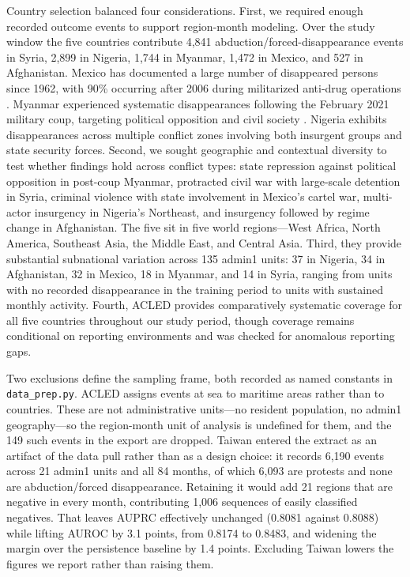 \documentclass[pdflatex,sn-mathphys-num]{sn-jnl}%
\theoremstyle{thmstyleone}%
\theoremstyle{thmstyletwo}%
\theoremstyle{thmstylethree}%
\begin{document}
Country selection balanced four considerations. First, we required enough recorded outcome events to support region-month modeling. Over the study window the five countries contribute 4,841 abduction/forced-disappearance events in Syria, 2,899 in Nigeria, 1,744 in Myanmar, 1,472 in Mexico, and 527 in Afghanistan. Mexico has documented a large number of disappeared persons since 1962, with 90\% occurring after 2006 during militarized anti-drug operations \cite{umnmexico2024}. Myanmar experienced systematic disappearances following the February 2021 military coup, targeting political opposition and civil society \cite{hrwmyanmar2021}. Nigeria exhibits disappearances across multiple conflict zones involving both insurgent groups and state security forces. Second, we sought geographic and contextual diversity to test whether findings hold across conflict types: state repression against political opposition in post-coup Myanmar, protracted civil war with large-scale detention in Syria, criminal violence with state involvement in Mexico's cartel war, multi-actor insurgency in Nigeria's Northeast, and insurgency followed by regime change in Afghanistan. The five sit in five world regions---West Africa, North America, Southeast Asia, the Middle East, and Central Asia. Third, they provide substantial subnational variation across 135 admin1 units: 37 in Nigeria, 34 in Afghanistan, 32 in Mexico, 18 in Myanmar, and 14 in Syria, ranging from units with no recorded disappearance in the training period to units with sustained monthly activity. Fourth, ACLED provides comparatively systematic coverage for all five countries throughout our study period, though coverage remains conditional on reporting environments and was checked for anomalous reporting gaps.

Two exclusions define the sampling frame, both recorded as named constants in \texttt{data\_prep.py}. ACLED assigns events at sea to maritime areas rather than to countries. These are not administrative units---no resident population, no admin1 geography---so the region-month unit of analysis is undefined for them, and the 149 such events in the export are dropped. Taiwan entered the extract as an artifact of the data pull rather than as a design choice: it records 6,190 events across 21 admin1 units and all 84 months, of which 6,093 are protests and none are abduction/forced disappearance. Retaining it would add 21 regions that are negative in every month, contributing 1,006 sequences of easily classified negatives. That leaves AUPRC effectively unchanged (0.8081 against 0.8088) while lifting AUROC by 3.1 points, from 0.8174 to 0.8483, and widening the margin over the persistence baseline by 1.4 points. Excluding Taiwan lowers the figures we report rather than raising them.
\end{document}
